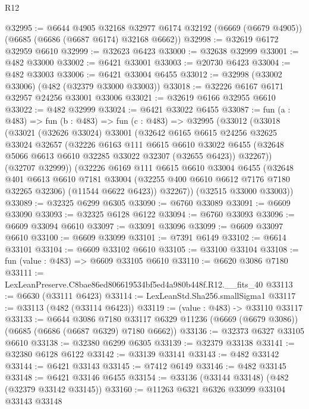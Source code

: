 \begin{lexlean}{R12}
\begin{coremodule}
@32995 := @6644
    @4905
    @32168
    @32977
    @6174
    @32192
    (@6669 (@6679 @4905))
    (@6685 (@6686 (@6687 @6174) @32168 @6662))
@32998 := @32619 @6172 @32959 @6610
@32999 := @32623 @6423
@33000 := @32638 @32999
@33001 := @482 @33000
@33002 := @6421 @33001
@33003 := @20730 @6423
@33004 := @482 @33003
@33006 := @6421 @33004 @6455
@33012 := @32998 (@33002 @33006) (@482 (@32379 @33000 @33003))
@33018 := @32226 @6167 @6171 @32957 @24256 @33001 @33006
@33021 := @32619 @6166 @32955 @6610
@33022 := @482 @32999
@33024 := @6421 @33022 @6455
@33087 := fun (a : @483) =>
  fun (b : @483) =>
  fun (c : @483) =>
  @32995
    (@33012
      (@33018
        (@33021
          (@32626 @33024)
          @33001
          (@32642
            @6165
            @6615
            @24256
            @32625
            @33024
            @32657
            (@32226
              @6163
              @111
              @6615
              @6610
              @33022
              @6455
              (@32648 @5066 @6613 @6610 @32285 @33022 @32307 (@32655 @6423))
              @32267))
          (@32707 @32999))
        (@32226
          @6169
          @111
          @6615
          @6610
          @33004
          @6455
          (@32648
            @401
            @6613
            @6610
            @7181
            @33004
            (@32255 @400 @6610 @6612 @7176 @7180 @32265 @32306)
            (@11544 @6622 @6423))
          @32267))
      (@32515 @33000 @33003))
@33089 := @32325 @6299 @6305
@33090 := @6760 @33089
@33091 := @6609 @33090
@33093 := @32325 @6128 @6122
@33094 := @6760 @33093
@33096 := @6609 @33094 @6610
@33097 := @33091 @33096
@33099 := @6609 @33097 @6610
@33100 := @6609 @33099
@33101 := @7391 @6149
@33102 := @6614 @33101
@33104 := @6609 @33102 @6610
@33105 := @33100 @33104
@33108 := fun (value : @483) => @6609 @33105 @6610
@33110 := @6620 @3086 @7180
@33111 := LexLeanPreserve.C8bae86ed806619534bf5ed4a980b448f.R12.__fits_40
@33113 := @6630 (@33111 @6423)
@33114 := LexLeanStd.Sha256.smallSigma1
@33117 := @33113 (@482 (@33114 @6423))
@33119 := (value : @483) -> @33110 @33117
@33133 := @6644
    @3086
    @7180
    @33117
    @6329
    @11236
    (@6669 (@6679 @3086))
    (@6685 (@6686 (@6687 @6329) @7180 @6662))
@33136 := @32373 @6327 @33105 @6610
@33138 := @32380 @6299 @6305
@33139 := @32379 @33138
@33141 := @32380 @6128 @6122
@33142 := @33139 @33141
@33143 := @482 @33142
@33144 := @6421 @33143
@33145 := @7412 @6149
@33146 := @482 @33145
@33148 := @6421 @33146 @6455
@33154 := @33136 (@33144 @33148) (@482 (@32379 @33142 @33145))
@33160 := @11263 @6321 @6326 @33099 @33104 @33143 @33148

\end{coremodule}
\end{lexlean}
